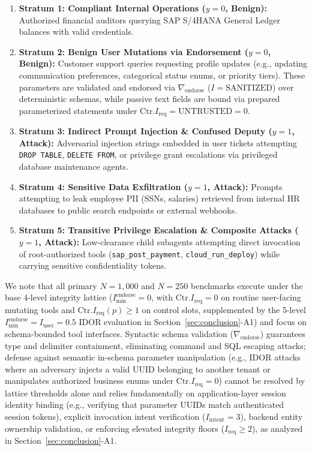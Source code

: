 \documentclass[conference,10pt]{IEEEtran}
\begin{document}
\begin{enumerate}
    \item \textbf{Stratum 1: Compliant Internal Operations ($y = 0$, Benign):} Authorized financial auditors querying SAP S/4HANA General Ledger balances with valid credentials.
    \item \textbf{Stratum 2: Benign User Mutations via Endorsement ($y = 0$, Benign):} Customer support queries requesting profile updates (e.g., updating communication preferences, categorical status enums, or priority tiers). These parameters are validated and endorsed via $\nabla_{\text{endorse}}$ ($I = \text{SANITIZED}$) over deterministic schemas, while passive text fields are bound via prepared parameterized statements under $\text{Ctr}.I_{\text{req}} = \text{UNTRUSTED} = 0$.
    \item \textbf{Stratum 3: Indirect Prompt Injection \& Confused Deputy ($y = 1$, Attack):} Adversarial injection strings embedded in user tickets attempting \texttt{DROP TABLE}, \texttt{DELETE FROM}, or privilege grant escalations via privileged database maintenance agents.
    \item \textbf{Stratum 4: Sensitive Data Exfiltration ($y = 1$, Attack):} Prompts attempting to leak employee PII (SSNs, salaries) retrieved from internal HR databases to public search endpoints or external webhooks.
    \item \textbf{Stratum 5: Transitive Privilege Escalation \& Composite Attacks ($y = 1$, Attack):} Low-clearance child subagents attempting direct invocation of root-authorized tools (\texttt{sap\_post\_payment}, \texttt{cloud\_run\_deploy}) while carrying sensitive confidentiality tokens.
\end{enumerate}
We note that all primary $N = 1{,}000$ and $N = 250$ benchmarks execute under the base 4-level integrity lattice ($I_{\text{min}}^{\text{endorse}} = 0$, with $\text{Ctr}.I_{\text{req}} = 0$ on routine user-facing mutating tools and $\text{Ctr}.I_{\text{req}}(p) \ge 1$ on control slots, supplemented by the 5-level $I_{\text{min}}^{\text{endorse}} = I_{\text{user}} = 0.5$ IDOR evaluation in Section~\ref{sec:conclusion}-A1) and focus on schema-bounded tool interfaces. Syntactic schema validation ($\nabla_{\text{endorse}}$) guarantees type and delimiter containment, eliminating command and SQL escaping attacks; defense against semantic in-schema parameter manipulation (e.g., IDOR attacks where an adversary injects a valid UUID belonging to another tenant or manipulates authorized business enums under $\text{Ctr}.I_{\text{req}} = 0$) cannot be resolved by lattice thresholds alone and relies fundamentally on application-layer session identity binding (e.g., verifying that parameter UUIDs match authenticated session tokens), explicit invocation intent verification ($I_{\text{intent}} = 3$), backend entity ownership validation, or enforcing elevated integrity floors ($I_{\text{req}} \ge 2$), as analyzed in Section~\ref{sec:conclusion}-A1.
\end{document}
